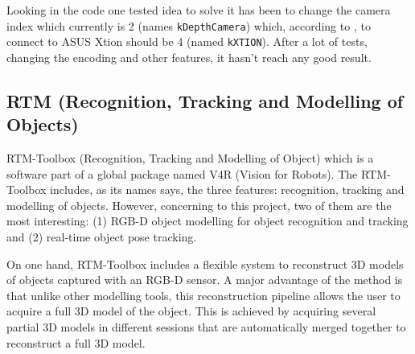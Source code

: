 \documentclass[12pt,a4paper,final,twoside,openright]{report}
\begin{document}
\break
Looking in the code one tested idea to solve it has been to change the camera index which currently is 2 (names \texttt{kDepthCamera}) which, according to \cite{Aldebaran}, to connect to ASUS Xtion should be 4 (named \texttt{kXTION}). After a lot of tests, changing the encoding and other features, it hasn't reach any good result. 

\subsection{RTM (Recognition, Tracking and Modelling of Objects)}
\label{sec:RTM}



RTM-Toolbox (Recognition, Tracking and Modelling of Object) \cite{Prankl2015} which is a software part of a global package named V4R (Vision for Robots). The RTM-Toolbox includes, as its names says, the three features: recognition, tracking and modelling of objects. However, concerning to this project, two of them are the most interesting: (1) RGB-D object modelling for object recognition and tracking and (2) real-time object pose tracking.

On one hand, RTM-Toolbox includes a flexible system to reconstruct 3D models of objects captured with an RGB-D sensor. A major advantage of the method is that unlike  other modelling tools, this reconstruction pipeline allows  the user to acquire a full 3D model of the object. This is  achieved by acquiring several partial 3D models in different sessions that are automatically merged together to reconstruct a full 3D model. 
\end{document}

